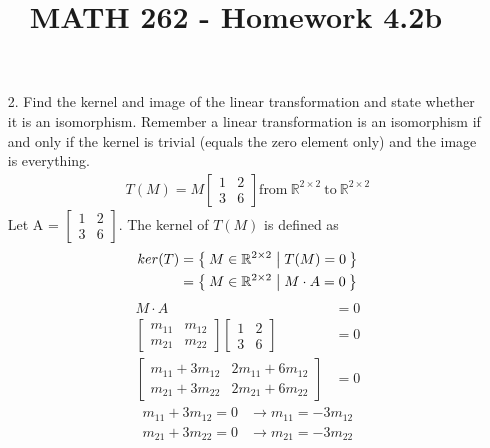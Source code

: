 \documentclass[letterpaper,12pt]{article}
\author{}
\title{MATH 262 - Homework 4.2b}
\date{} %
\begin{document}
\maketitle

\begin{enumerate}
  \item[2.]
    Find the kernel and image of the linear transformation and state whether it is an isomorphism. Remember a linear transformation is an isomorphism if and only if the kernel is trivial (equals the zero element only) and the image is everything.
    \begin{align*}
      T(M) = M
      \begin{bmatrix}
        1 & 2 \\
        3 & 6
      \end{bmatrix}
      \text{from} \ \mathbb{R}^{2 \times 2} \ \text{to} \ \mathbb{R}^{2 \times 2}
    \end{align*}
    Let A =
    $\begin{bmatrix}
      1 & 2 \\
      3 & 6
    \end{bmatrix}$.
    The kernel of $T(M)$ is defined as
    \begin{align*}
      ker(T) &= \Set{M \in \mathbb{R}^{2 \times 2} | T(M) = 0} \\
      &= \Set{
        M \in \mathbb{R}^{2 \times 2}
        | M \cdot A = 0
      }
    \end{align*}
    \begin{align*}
      M \cdot A &= 0 \\
      \begin{bmatrix}
        m_{11} & m_{12} \\
        m_{21} & m_{22}
      \end{bmatrix}
      \begin{bmatrix}
        1 & 2 \\
        3 & 6
      \end{bmatrix} &= 0 \\
      \begin{bmatrix}
        m_{11} + 3m_{12} & 2m_{11} + 6m_{12} \\
        m_{21} + 3m_{22} & 2m_{21} + 6m_{22}
      \end{bmatrix} &= 0
    \end{align*}
    \begin{align*}
      m_{11} + 3m_{12} = 0 &\longrightarrow m_{11} = -3m_{12} \\
      m_{21} + 3m_{22} = 0 &\longrightarrow m_{21} =-3m_{22}

\end{align*}
\end{enumerate}
\end{document}
